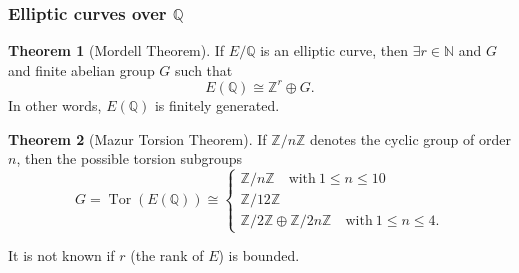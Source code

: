 \documentclass[12pt,handout]{beamer} %
\newcommand{\Q}{\mathbb Q}
\newcommand{\Z}{\mathbb Z}
\newcommand{\N}{\mathbb N}
\newcommand{\C}{\mathbb C}
\newcommand{\R}{\mathbb R}
\theoremstyle{definition}
\newtheorem{teo}{Theorem}
\begin{document}

\begin{frame}
 \frametitle{Elliptic curves over $\Q$}
 
 \begin{teo}[Mordell Theorem]
If $E/\Q$ is an elliptic curve, then $\exists r\in\N$ and $G$ and finite abelian group $G$ 
such that
$$E(\Q)\cong\Z^r\oplus G.$$
In other words, $E(\Q)$ is finitely generated.
\end{teo}\bigskip\pause

 \begin{teo}[Mazur Torsion Theorem]
 If $\Z/n\Z$ denotes the cyclic group of order $n$, then the possible torsion subgroups 
 $$G=\operatorname{Tor}(E(\Q))\cong\begin{cases}
 \Z/n\Z\quad \text{with}\ 1 \le n \le 10\\        
 \Z/12\Z\\
 \Z/2\Z\oplus\Z/2n\Z\quad \text{with}\ 1 \le n \le 4.
         \end{cases}$$
 \end{teo}\pause
 
 It is not known if $r$ (the rank of $E$) is bounded. 

 \end{frame}
\end{document}
